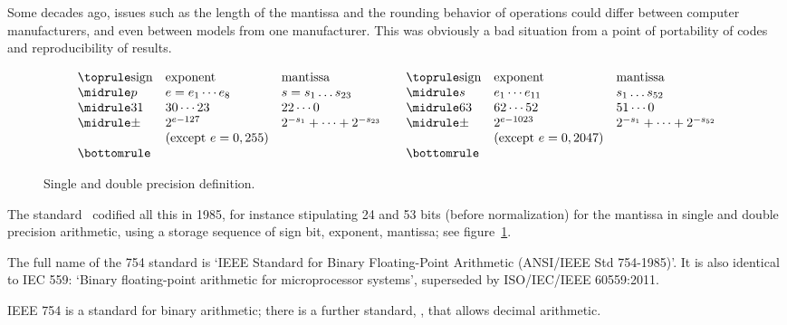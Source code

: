 Some decades ago, issues such as the length of the
mantissa and the rounding behavior of operations
could differ between computer manufacturers, and even between models
from one manufacturer. This was obviously a bad situation from a point
of portability of codes and reproducibility of results.
\begin{figure}[ht]
  \begin{equation}
  \begin{array}{ l l l }
    \toprule
    \hbox{sign}&\hbox{exponent}&\hbox{mantissa}\\
    \midrule
    p&e=e_1\cdots e_8 &s=s_1\dots s_{23}\\
    \midrule
    31&30\cdots 23&22\cdots 0\\
    \midrule
    \pm & 2^{e-127} & 2^{-s_1}+\cdots + 2^{-s_{23}} \\
    & \hbox{(except $e=0,255$)} & \\
    \bottomrule
  \end{array}\quad
  \begin{array}{ lll }
    \toprule
    \hbox{sign}&\hbox{exponent}&\hbox{mantissa}\\
    \midrule
    s&e_1\cdots e_{11}&s_1\dots s_{52}\\
    \midrule
    63&62\cdots 52&51\cdots 0\\
    \midrule
    \pm & 2^{e-1023} & 2^{-s_1}+\cdots + 2^{-s_{52}} \\
    & \hbox{(except $e=0,2047$)} & \\
    \bottomrule
  \end{array}
  \end{equation}
  \caption{Single and double precision definition.}
  \label{fig:single-double}
\end{figure}
The  standard~\cite{754-2019}
codified all this in 1985, for instance stipulating 24 and 53 bits
(before normalization)
for the
mantissa in single and double precision arithmetic,
using a storage sequence of sign bit, exponent, mantissa;
see figure~\ref{fig:single-double}.

\begin{remark}
  The full name of the 754 standard is `IEEE Standard for Binary
  Floating-Point Arithmetic (ANSI/IEEE Std 754-1985)'. It is also
  identical to IEC 559: `Binary floating-point arithmetic for
  microprocessor systems', superseded by ISO/IEC/IEEE 60559:2011.

  IEEE 754 is a standard for binary arithmetic;
  there is a further standard,
  , that allows decimal arithmetic.
\end{remark}

